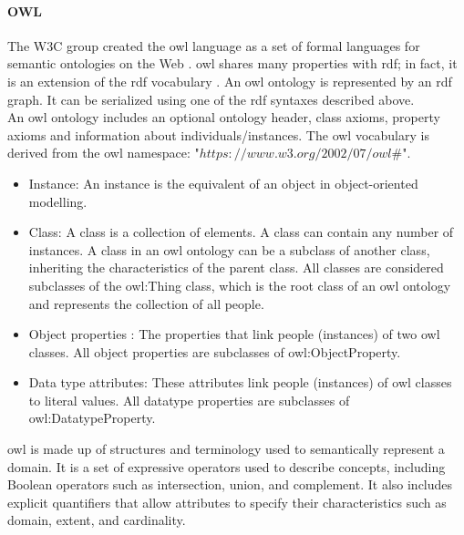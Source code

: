             \paragraph{OWL \label{para:owl}}
            The W3C group created the \acrshort{owl} language as a set of formal languages for semantic ontologies on the Web \cite{liu2010ontology}. \acrshort{owl} shares many properties with \acrshort{rdf}; in fact, it is an extension of the \acrshort{rdf} vocabulary \cite{mcguinness2004owl}. An \acrshort{owl} ontology is represented by an \acrshort{rdf} graph. It can be serialized using one of the \acrshort{rdf} syntaxes described above. \\
        
            An \acrshort{owl} ontology includes an optional ontology header, class axioms, property axioms and information about individuals/instances. The \acrshort{owl} vocabulary is derived from the \acrshort{owl} namespace: "$https://www.w3.org/2002/07/owl\#$". 
        
            \begin{itemize}
                \item Instance: An instance is the equivalent of an object in object-oriented modelling. 
                \item Class: A class is a collection of elements. A class can contain any number of instances. A class in an \acrshort{owl} ontology can be a subclass of another class, inheriting the characteristics of the parent class. All classes are considered subclasses of the owl:Thing class, which is the root class of an \acrshort{owl} ontology and represents the collection of all people. 
                \item Object properties : The properties that link people (instances) of two \acrshort{owl} classes. All object properties are subclasses of owl:ObjectProperty. 
                \item Data type attributes: These attributes link people (instances) of \acrshort{owl} classes to literal values. All datatype properties are subclasses of owl:DatatypeProperty.
            \end{itemize}
        
            \acrshort{owl} is made up of structures and terminology used to semantically represent a domain. It is a set of expressive operators used to describe concepts, including Boolean operators such as intersection, union, and complement. It also includes explicit quantifiers that allow attributes to specify their characteristics such as domain, extent, and cardinality.\\
        
